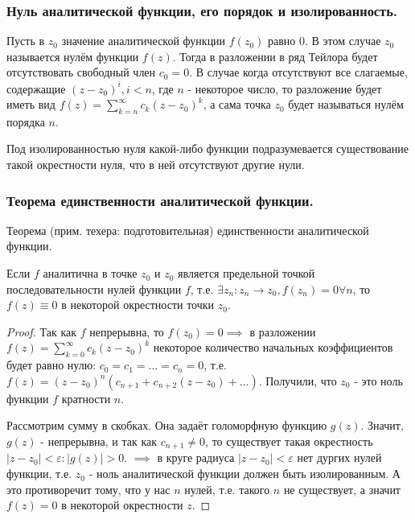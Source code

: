 \subsubsection{Нуль аналитической функции, его порядок и изолированность.}

Пусть в $z_0$ значение аналитической функции $f(z_0)$ равно 0. В этом случае $z_0$ называется нулём функции $f(z)$. Тогда в разложении в ряд Тейлора будет отсутствовать свободный член $c_0=0$. В случае когда отсутствуют все слагаемые, содержащие $(z - z_0)^i, i < n$, где $n$ - некоторое число, то разложение будет иметь вид $f(z) = \sum_{k=n}^{\infty}c_k(z-z_0)^k$, а сама точка $z_0$ будет называться нулём порядка $n$.

Под изолированностью нуля какой-либо функции подразумевается существование такой окрестности нуля, что в ней отсутствуют другие нули.

\subsubsection{Теорема единственности аналитической функции.}

\begin{theorem*}
	Теорема (прим. техера: подготовительная) единственности аналитической функции.
	
	Если $f$ аналитична в точке $z_0$ и $z_0$ является предельной точкой последовательности нулей функции $f$, т.е. $\exists{z_n}: z_n \rightarrow z_0, f(z_n) = 0 \forall n$, то $f(z)\equiv0$ в некоторой окрестности точки $z_0$.
\end{theorem*}

\begin{proof}
	Так как $f$ непрерывна, то $f(z_0) = 0 \implies$ в разложении $f(z) = \sum_{k=0}^{\infty} c_k(z-z_0)^k$ некоторое количество начальных коэффициентов будет равно нулю: $c_0 = c_1 = \dots = c_n = 0$, т.е. $f(z) = (z-z_0)^n (c_{n+1} + c_{n+2}(z-z_0) + \dots)$. Получили, что $z_0$ - это ноль функции $f$ кратности $n$.
	
	Рассмотрим сумму в скобках. Она задаёт голоморфную функцию $g(z)$. Значит, $g(z)$ - непрерывна, и так как $c_{n+1} \neq 0$, то существует такая окрестность $|z - z_0| < \varepsilon: |g(z)| > 0$. $\implies$ в круге радиуса $|z-z_0| < \varepsilon$ нет дургих нулей функции, т.е. $z_0$ - ноль аналитической функции должен быть изолированным. А это противоречит тому, что у нас $n$ нулей, т.е. такого $n$ не существует, а значит $f(z) = 0$ в некоторой окрестности $z$.
\end{proof}

